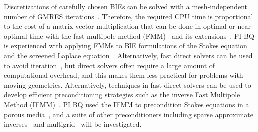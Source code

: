 Discretizations of carefully chosen BIEs can be solved with a
mesh-independent number of GMRES
iterations~\cite{cam-ips-kel-mey-xue1996}. Therefore, the required CPU
time is proportional to the cost of a matrix-vector multiplication that
can be done in optimal or near-optimal time with the fast multipole
method (FMM)~\cite{fmm5} and its extensions~\cite{fmm1, fmm2, fmm3,
fmm4, fmm6, fmm7, fmm8}. PI BQ is experienced with applying FMMs to
BIE formulations of the Stokes equation~\cite{qua-bir2014,
bys-sha-qua2020} and the screened Laplace equation~\cite{kro-qua2011,
qua2011}. Alternatively, fast direct solvers can be used to avoid
iteration~\cite{fds1, fds2, fds3, fds4, fds5, fds6, fds7, fds8,
ho2016cpam2, ho2016cpam1, minden2016, minden2017siammms}, but direct
solvers often require a large amount of computational overhead, and this
makes them less practical for problems with moving geometries.
Alternatively, techniques in fast direct solvers can be used to develop
efficient preconditioning strategies such as the inverse Fast Multipole
Method (IFMM)~\cite{cou-pou-dar2017}. PI BQ used the IFMM to
precondition Stokes equations in a porous media~\cite{qua-cou-dar2018},
and a suite of other preconditioners including sparse approximate
inverses~\cite{che2000} and multigrid~\cite{hem-sch1981, sch1982} will
be investigated.

